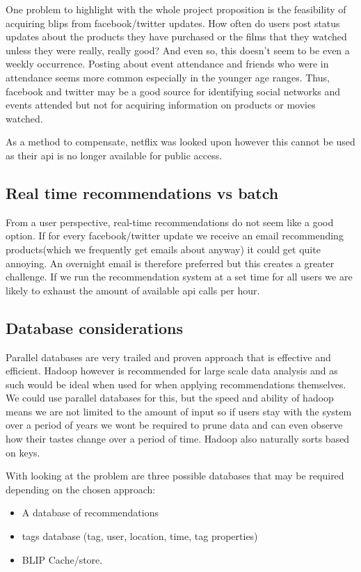 \documentclass[11pt]{article}
\begin{document}
One problem to highlight with the whole project proposition is the feasibility of acquiring blips from facebook/twitter updates. How often do users post status updates about the products they have purchased or the films that they watched unless they were really, really good? And even so, this doesn't seem to be even a weekly occurrence. Posting about event attendance and friends who were in attendance seems more common especially in the younger age ranges. Thus, facebook and twitter may be a good source for identifying social networks and events attended but not for acquiring information on products or movies watched. 

As a method to compensate, netflix was looked upon however this cannot be used as their api is no longer available for public access. 

\subsection{Real time recommendations vs batch}
From a user perspective, real-time recommendations do not seem like a good option. If for every facebook/twitter update we receive an email recommending products(which we frequently get emails about anyway) it could get quite annoying. An overnight email is therefore preferred but this creates a greater challenge. If we run the recommendation system at a set time for all users we are likely to exhaust the amount of available api calls per hour.

\subsection{Database considerations}
Parallel databases are very trailed and proven approach that is effective and efficient. Hadoop however is recommended for large scale data analysis and as such would be ideal when used for when applying recommendations themselves. We could use parallel databases for this, but the speed and ability of hadoop means we are not limited to the amount of input so if users stay with the system over a period of years we wont be required to prune data and can even observe how their tastes change over a period of time. Hadoop also naturally sorts based on keys.

With looking at the problem are three possible databases that may be required depending on the chosen approach:

\begin{itemize}
\item A database of recommendations
\item tags database (tag, user, location, time, tag properties)
\item BLIP Cache/store.
\end{itemize}
\end{document}
